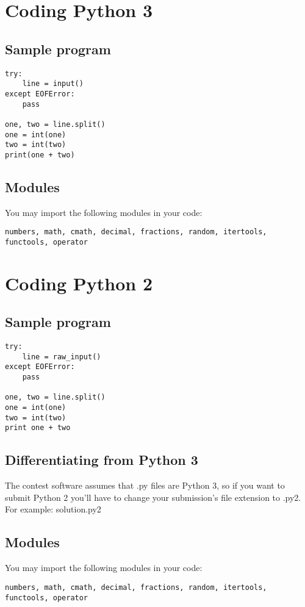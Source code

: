 \documentclass{article}
\begin{document}
	\section{Coding Python 3}
	\subsection{Sample program}
	\lstset{language=Python}
	\begin{lstlisting}
try:
    line = input()
except EOFError:
    pass

one, two = line.split()
one = int(one)
two = int(two)
print(one + two)
	\end{lstlisting}
	
	\subsection{Modules}
	You may import the following modules in your code:
	\begin{lstlisting}
numbers, math, cmath, decimal, fractions, random, itertools, functools, operator
	\end{lstlisting}

	\section{Coding Python 2}
	\subsection{Sample program}
	\lstset{language=Python}
	\begin{lstlisting}
try:
    line = raw_input()
except EOFError:
    pass

one, two = line.split()
one = int(one)
two = int(two)
print one + two
	\end{lstlisting}
	
	\subsection{Differentiating from Python 3}
	The contest software assumes that .py files are Python 3, so if you want to submit Python 2 you'll have to change your submission's file extension to .py2.
	For example: solution.py2

	\subsection{Modules}
	You may import the following modules in your code:
	\begin{lstlisting}
numbers, math, cmath, decimal, fractions, random, itertools, functools, operator
	\end{lstlisting}
\end{document}
